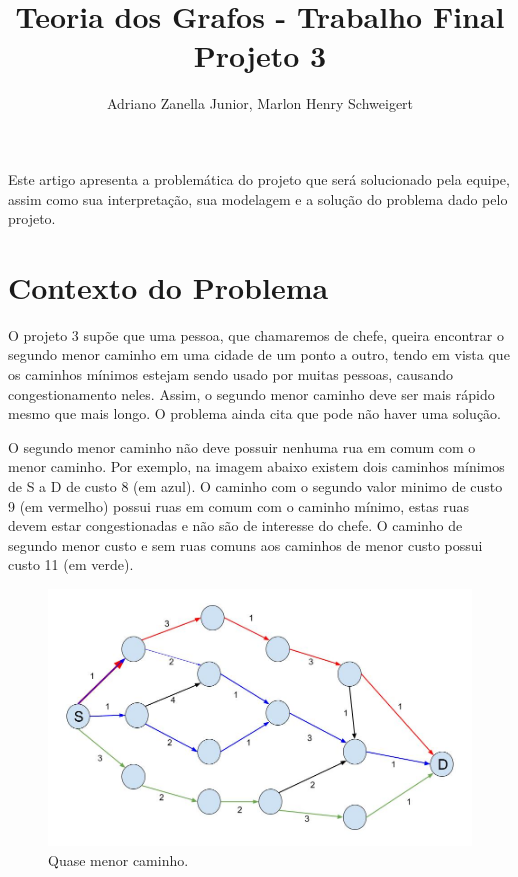 \documentclass[12pt]{article}
\title{Teoria dos Grafos - Trabalho Final\\ Projeto 3}
\author{Adriano Zanella Junior\inst{1}, Marlon Henry Schweigert\inst{2}}
\begin{document}
 

\maketitle
     
\begin{resumo} 
    Este artigo apresenta a problemática do projeto que será solucionado pela equipe, assim como sua interpretação, sua modelagem e a solução do problema dado pelo projeto.
\end{resumo}


\section{Contexto do Problema}
    
O projeto 3 supõe que uma pessoa, que chamaremos de chefe, queira encontrar o segundo menor caminho em uma cidade de um ponto a outro, tendo em vista que os caminhos mínimos estejam sendo usado por muitas pessoas, causando congestionamento neles. Assim, o segundo menor caminho deve ser mais rápido mesmo que mais longo. O problema ainda cita que pode não haver uma solução. 

O segundo menor caminho não deve possuir nenhuma rua em comum com o menor caminho. Por exemplo, na imagem abaixo existem dois caminhos mínimos de S a D de custo 8 (em azul). O caminho  com o segundo valor minimo de custo 9 (em vermelho) possui ruas em comum com o caminho mínimo, estas ruas devem estar congestionadas e não são de interesse do chefe. O caminho de segundo menor custo e sem ruas comuns aos caminhos de menor custo possui custo 11 (em verde).

\begin{figure}[ht]
    \centering
    \includegraphics[width=.85\textwidth]{TEGexempleColor.jpg}
    \caption{Quase menor caminho.}
    \label{fig. 1:}
\end{figure}
\end{document}
